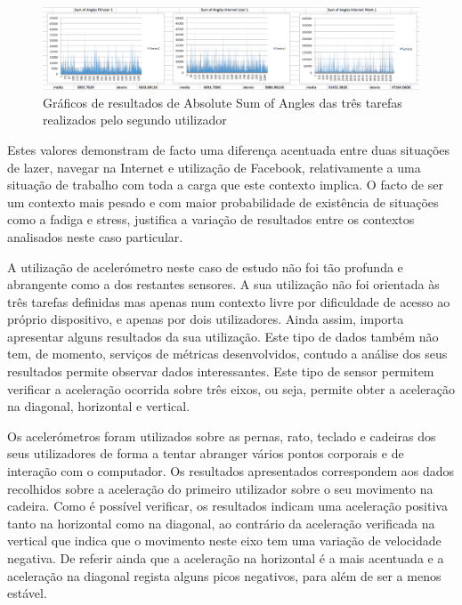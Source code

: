  \begin{figure}[htb]
   \centering
   \includegraphics[scale=0.3]{Images/sumofangles.png}
   \caption{Gráficos de resultados de Absolute Sum of Angles das três tarefas realizados pelo segundo utilizador}
\end{figure}

Estes valores demonstram de facto uma diferença acentuada entre duas situações de lazer, navegar na Internet e utilização de Facebook, relativamente a uma situação de trabalho com toda a carga que este contexto implica. O facto de ser um contexto mais pesado e com maior probabilidade de existência de situações como a fadiga e stress, justifica a variação de resultados entre os contextos analisados neste caso particular.


A utilização de acelerómetro neste caso de estudo não foi tão profunda e abrangente como a dos restantes sensores. A sua utilização não foi orientada às três tarefas definidas mas apenas num contexto livre por dificuldade de acesso ao próprio dispositivo, e apenas por dois utilizadores. Ainda assim, importa apresentar alguns resultados da sua utilização. Este tipo de dados também não tem, de momento, serviços de métricas desenvolvidos, contudo a análise dos seus resultados permite observar dados interessantes. Este tipo de sensor permitem verificar a aceleração ocorrida sobre três eixos, ou seja, permite obter a aceleração na diagonal, horizontal e vertical.

Os acelerómetros foram utilizados sobre as pernas, rato, teclado e cadeiras dos seus utilizadores de forma a tentar abranger vários pontos corporais e de interação com o computador. Os resultados apresentados correspondem aos dados recolhidos sobre a aceleração do primeiro utilizador sobre o seu movimento na cadeira. Como é possível verificar, os resultados indicam uma aceleração positiva tanto na horizontal como na diagonal, ao contrário da aceleração verificada na vertical que indica que o movimento neste eixo tem uma variação de velocidade negativa. De referir ainda que a aceleração na horizontal é a mais acentuada e a aceleração na diagonal regista alguns picos negativos, para além de ser a menos estável.


